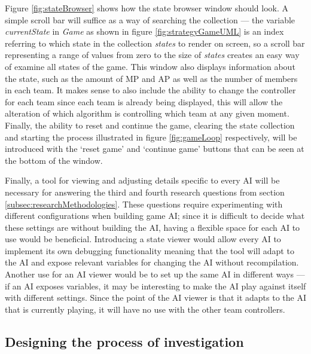 \documentclass[11pt, a4paper]{report}
\begin{document}
Figure \ref{fig:stateBrowser} shows how the state browser window should look. A simple scroll bar will suffice as a way of searching the collection --- the variable \emph{currentState} in \emph{Game} as shown in figure \ref{fig:strategyGameUML} is an index referring to which state in the collection \emph{states} to render on screen, so a scroll bar representing a range of values from zero to the size of \emph{states} creates an easy way of examine all states of the game. This window also displays information about the state, such as the amount of MP and AP as well as the number of members in each team. It makes sense to also include the ability to change the controller for each team since each team is already being displayed, this will allow the alteration of which algorithm is controlling which team at any given moment. Finally, the ability to reset and continue the game, clearing the state collection and starting the process illustrated in figure \ref{fig:gameLoop} respectively, will be introduced with the `reset game' and `continue game' buttons that can be seen at the bottom of the window. 

Finally, a tool for viewing and adjusting details specific to every AI will be necessary for answering the third and fourth research questions from section \ref{subsec:researchMethodologies}. These questions require experimenting with different configurations when building game AI; since it is difficult to decide what these settings are without building the AI, having a flexible space for each AI to use would be beneficial. Introducing a state viewer would allow every AI to implement its own debugging functionality meaning that the tool will adapt to the AI and expose relevant variables for changing the AI without recompilation. Another use for an AI viewer would be to set up the same AI in different ways --- if an AI exposes variables, it may be interesting to make the AI play against itself with different settings. Since the point of the AI viewer is that it adapts to the AI that is currently playing, it will have no use with the other team controllers.

\subsection{Designing the process of investigation}
\label{subsec:designingInvestigation process}
\end{document}
